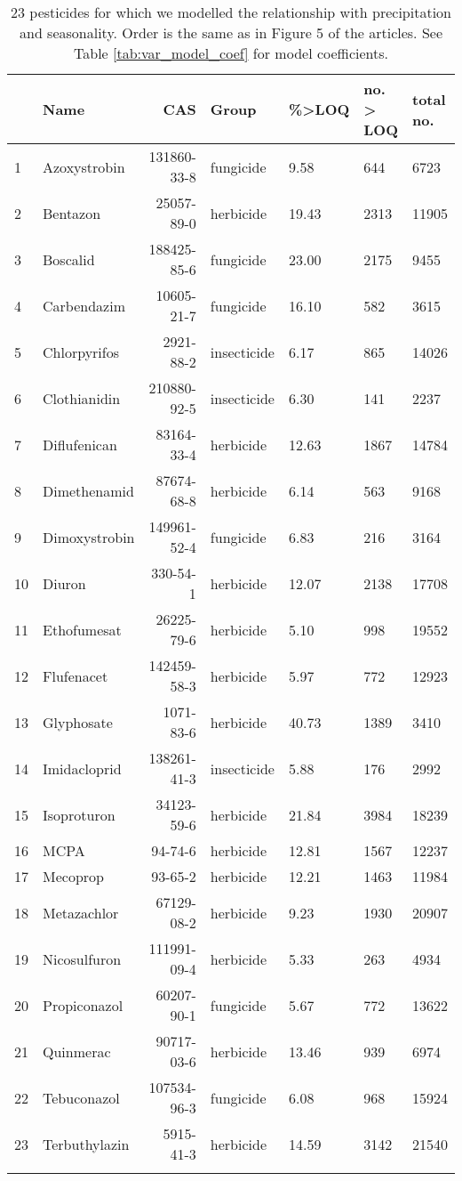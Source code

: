 \begingroup\fontsize{8pt}{10pt}\selectfont
\begin{longtable}{lp{2.5cm}rlp{1.5cm}p{2cm}p{2cm}}
\caption[23 pesticides for which we modelled the relationship with precipitation and seasonality.]{23 pesticides for which we modelled the relationship with precipitation and seasonality.
                    Order is the same as in Figure 5 of the articles. See Table \ref{tab:var_model_coef} for model coefficients.} \\ 
  \toprule
 & Name & CAS & Group & \%>LOQ & no. > LOQ & total no. \\ 
  \midrule
1 & Azoxystrobin & 131860-33-8 & fungicide & 9.58 & 644 & 6723 \\ 
  2 & Bentazon & 25057-89-0 & herbicide & 19.43 & 2313 & 11905 \\ 
  3 & Boscalid & 188425-85-6 & fungicide & 23.00 & 2175 & 9455 \\ 
  4 & Carbendazim & 10605-21-7 & fungicide & 16.10 & 582 & 3615 \\ 
  5 & Chlorpyrifos & 2921-88-2 & insecticide & 6.17 & 865 & 14026 \\ 
  6 & Clothianidin & 210880-92-5 & insecticide & 6.30 & 141 & 2237 \\ 
  7 & Diflufenican & 83164-33-4 & herbicide & 12.63 & 1867 & 14784 \\ 
  8 & Dimethenamid & 87674-68-8 & herbicide & 6.14 & 563 & 9168 \\ 
  9 & Dimoxystrobin & 149961-52-4 & fungicide & 6.83 & 216 & 3164 \\ 
  10 & Diuron & 330-54-1 & herbicide & 12.07 & 2138 & 17708 \\ 
  11 & Ethofumesat & 26225-79-6 & herbicide & 5.10 & 998 & 19552 \\ 
  12 & Flufenacet & 142459-58-3 & herbicide & 5.97 & 772 & 12923 \\ 
  13 & Glyphosate & 1071-83-6 & herbicide & 40.73 & 1389 & 3410 \\ 
  14 & Imidacloprid & 138261-41-3 & insecticide & 5.88 & 176 & 2992 \\ 
  15 & Isoproturon & 34123-59-6 & herbicide & 21.84 & 3984 & 18239 \\ 
  16 & MCPA & 94-74-6 & herbicide & 12.81 & 1567 & 12237 \\ 
  17 & Mecoprop & 93-65-2 & herbicide & 12.21 & 1463 & 11984 \\ 
  18 & Metazachlor & 67129-08-2 & herbicide & 9.23 & 1930 & 20907 \\ 
  19 & Nicosulfuron & 111991-09-4 & herbicide & 5.33 & 263 & 4934 \\ 
  20 & Propiconazol & 60207-90-1 & fungicide & 5.67 & 772 & 13622 \\ 
  21 & Quinmerac & 90717-03-6 & herbicide & 13.46 & 939 & 6974 \\ 
  22 & Tebuconazol & 107534-96-3 & fungicide & 6.08 & 968 & 15924 \\ 
  23 & Terbuthylazin & 5915-41-3 & herbicide & 14.59 & 3142 & 21540 \\ 
   \bottomrule
\label{tab:var_model}
\end{longtable}
\endgroup
